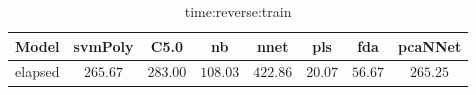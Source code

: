 \begin{table}[!ht]
	\centering
	\begin{tabular}{|c|c|c|c|c|c|c|c|}
		\hline
		Model & svmPoly & C5.0 & nb & nnet & pls & fda & pcaNNet \\ \hline
		elapsed & $265.67$ & $283.00$ & $108.03$ & $422.86$ & $20.07$ & $56.67$ & $265.25$ \\ \hline
	\end{tabular}
	\caption{time:reverse:train}
	\label{tab:time:reverse:train}
\end{table}
